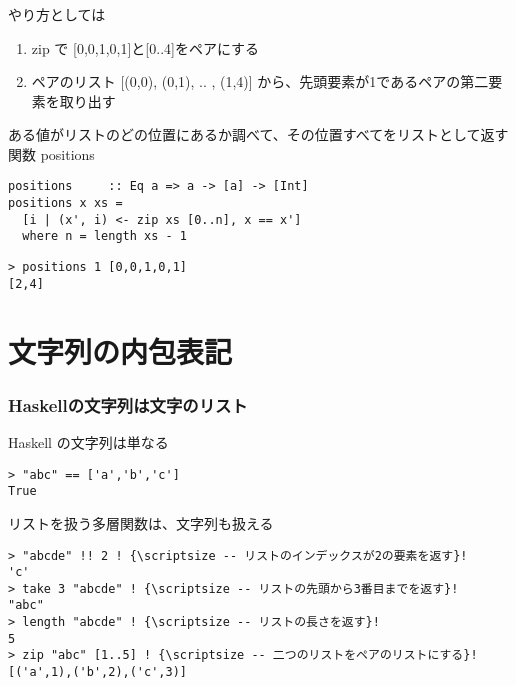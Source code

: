 \documentclass[dvipdfmx,cjk,xcolor=dvipsnames,envcountsect,notheorems,12pt]{beamer}
\theoremstyle{definition}
\begin{document}
\begin{frame}[fragile]
\frametitle{}
やり方としては
  \begin{enumerate}
  \item zip で [0,0,1,0,1]と[0..4]をペアにする
  \item ペアのリスト [(0,0), (0,1), .. , (1,4)] から、先頭要素が1であるペアの第二要素を取り出す
  \end{enumerate}
\begin{exampleblock}{ある値がリストのどの位置にあるか調べて、その位置すべてをリストとして返す関数 positions}
\begin{lstlisting}[frame=none]
positions     :: Eq a => a -> [a] -> [Int]
positions x xs =
  [i | (x', i) <- zip xs [0..n], x == x']
  where n = length xs - 1
\end{lstlisting}
\begin{lstlisting}[frame=none]
> positions 1 [0,0,1,0,1]
[2,4]
\end{lstlisting}
\end{exampleblock}
\end{frame}

\section{文字列の内包表記}

\begin{frame}[fragile]
\frametitle{Haskellの文字列は文字のリスト}
Haskell の文字列は単なる 
\begin{lstlisting}
> "abc" == ['a','b','c']
True
\end{lstlisting}
リストを扱う多層関数は、文字列も扱える
\begin{lstlisting}[escapechar=!]
> "abcde" !! 2 ! {\scriptsize -- リストのインデックスが2の要素を返す}!
'c'
> take 3 "abcde" ! {\scriptsize -- リストの先頭から3番目までを返す}!
"abc"
> length "abcde" ! {\scriptsize -- リストの長さを返す}!
5
> zip "abc" [1..5] ! {\scriptsize -- 二つのリストをペアのリストにする}!
[('a',1),('b',2),('c',3)]
\end{lstlisting}
\end{frame}
\end{document}
